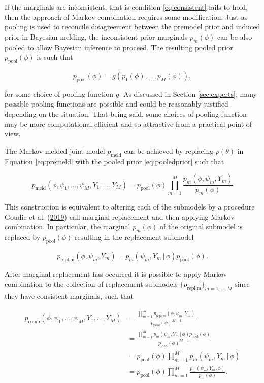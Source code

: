 \documentclass[11pt,]{book}
\begin{document}
If the marginals are inconsistent, that is condition
\eqref{eq:consistent} fails to hold, then the approach of Markov
combination requires some modification. Just as pooling is used to
reconcile disagreement between the premodel prior and induced prior in
Bayesian melding, the inconsistent prior marginals \(p_m(\phi)\) can be
also pooled to allow Bayesian inference to proceed. The resulting pooled
prior \(p_\text{pool}(\phi)\) is such that

\begin{equation}
p_\text{pool}(\phi) = g(p_1(\phi), \ldots, p_M(\phi)), \label{eq:pooledprior}
\end{equation}

for some choice of pooling function \(g\). As discussed in Section
\ref{sec:experts}, many possible pooling functions are possible and
could be reasonably justified depending on the situation. That being
said, some choices of pooling function may be more computational
efficient and so attractive from a practical point of view.

The Markov melded joint model \(p_{\text{meld}}\) can be achieved by
replacing \(p(\theta)\) in Equation \eqref{eq:premeld} with the pooled
prior \eqref{eq:pooledprior} such that

\begin{equation}
p_{\text{meld}}(\phi, \psi_1, \ldots, \psi_M, Y_1, \ldots, Y_M) = p_\text{pool}(\phi) \prod_{m=1}^M \frac{p_m(\phi, \psi_m, Y_m)}{p_m(\phi)} \label{eq:meld}
\end{equation}

This construction is equivalent to altering each of the submodels by a
procedure Goudie et al.
(\protect\hyperlink{ref-goudie2019joining}{2019}) call marginal
replacement and then applying Markov combination. In particular, the
marginal \(p_m(\phi)\) of the original submodel is replaced by
\(p_\text{pool}(\phi)\) resulting in the replacement submodel

\begin{equation}
p_{\text{repl,m}}(\phi, \psi_m, Y_m) = p_m(\psi_m, Y_m \, | \, \phi)p_\text{pool}(\phi).
\end{equation}

After marginal replacement has occurred it is possible to apply Markov
combination to the collection of replacement submodels
\(\{p_{\text{repl,m}}\}_{m = 1,\ldots,M}\) since they have consistent
marginals, such that

\begin{align}
p_{\mathrm{comb}}(\phi, \psi_1, \ldots, \psi_M, Y_1, \ldots, Y_M) 
&= \frac{\prod_{m=1}^{M} p_{\text{repl,m}}(\phi, \psi_m, Y_m)}{p_\text{pool}(\phi)^{M-1}} \nonumber \\
&= \frac{\prod_{m=1}^{M} p_m(\psi_m, Y_m \, | \, \phi)p_\text{pool}(\phi)}{p_\text{pool}(\phi)^{M-1}} \nonumber \\
&= p_\text{pool}(\phi) \prod_{m=1}^{M} p_m(\psi_m, Y_m \, | \, \phi) \nonumber \\
&= p_\text{pool}(\phi) \prod_{m=1}^{M} \frac{p_m(\psi_m, Y_m, \phi)}{p_m(\phi)}.
\end{align}
\end{document}

